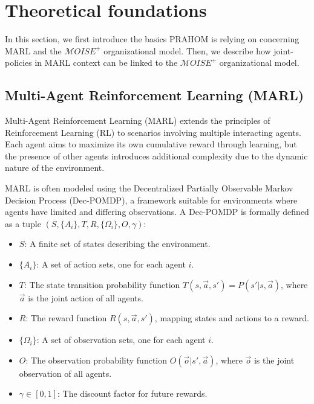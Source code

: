 \documentclass[conference]{IEEEtran}
\begin{document}
\section{Theoretical foundations}\label{sec:theoretical_foundations}

In this section, we first introduce the basics PRAHOM is relying on concerning MARL and the $\mathcal{M}OISE^{+}$ organizational model. Then, we  describe how joint-policies in MARL context can be linked to the $\mathcal{M}OISE^{+}$ organizational model.

\subsection{Multi-Agent Reinforcement Learning (MARL)}

Multi-Agent Reinforcement Learning (MARL) extends the principles of Reinforcement Learning (RL) to scenarios involving multiple interacting agents. Each agent aims to maximize its own cumulative reward through learning, but the presence of other agents introduces additional complexity due to the dynamic nature of the environment.

MARL is often modeled using the Decentralized Partially Observable Markov Decision Process (Dec-POMDP), a framework suitable for environments where agents have limited and differing observations. A Dec-POMDP is formally defined as a tuple $(S, \{A_i\}, T, R, \{\Omega_i\}, O, \gamma)$:

\begin{itemize}
    \item $S$: A finite set of states describing the environment.
    \item $\{A_i\}$: A set of action sets, one for each agent $i$.
    \item $T$: The state transition probability function $T(s, \vec{a}, s') = P(s'|s, \vec{a})$, where $\vec{a}$ is the joint action of all agents.
    \item $R$: The reward function $R(s, \vec{a}, s')$, mapping states and actions to a reward.
    \item $\{\Omega_i\}$: A set of observation sets, one for each agent $i$.
    \item $O$: The observation probability function $O(\vec{o} | s', \vec{a})$, where $\vec{o}$ is the joint observation of all agents.
    \item $\gamma \in [0,1]$: The discount factor for future rewards.
\end{itemize}
\end{document}

